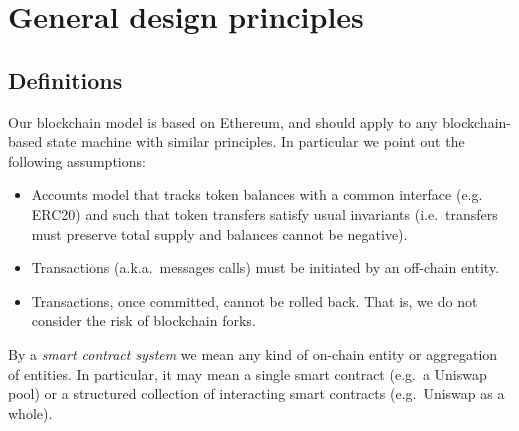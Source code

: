 \documentclass[a4paper,10pt]{article}
\theoremstyle{remark}
\begin{document}
\section{General design principles}


\subsection{Definitions}

Our blockchain model is based on Ethereum, and should apply to any blockchain-based state machine with similar principles.
%
In particular we point out the following assumptions:
\begin{itemize}
\item Accounts model that tracks token balances with a common interface (e.g. ERC20) and such that token transfers satisfy usual invariants (i.e.~transfers must preserve total supply and balances cannot be negative).
\item Transactions (a.k.a.~messages calls) must be initiated by an off-chain entity.
\item Transactions, once committed, cannot be rolled back. That is, we do not consider the risk of blockchain forks.
\end{itemize}
By a \emph{smart contract system} we mean any kind of on-chain entity or aggregation of entities. In particular, it may mean a single smart contract (e.g.~a Uniswap pool) or a structured collection of interacting smart contracts (e.g.~Uniswap as a whole).
\end{document}
